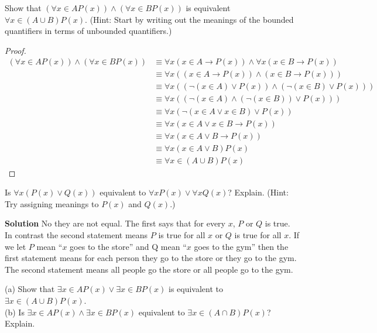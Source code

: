 \begin{tcolorbox}[title=Problem 8, breakable]
    Show that $(\forall{x} \in AP(x)) \wedge (\forall{x} \in B P(x))$ is equivalent 
    $\forall{x} \in (A \cup B)P(x)$. (Hint: Start by writing out the meanings of
    the bounded quantifiers in terms of unbounded quantifiers.)
\end{tcolorbox}

\begin{proof}
    \begin{align*}
        (\forall{x} \in AP(x)) \wedge (\forall{x} \in B P(x)) 
            &\equiv \forall{x}(x \in A \rightarrow P(x)) \wedge \forall{x}(x \in B \rightarrow P(x))  && \\
        &\equiv \forall{x}((x \in A \rightarrow P(x)) \wedge (x \in B \rightarrow P(x)))  && \\
        &\equiv \forall{x}((\neg(x \in A) \vee P(x)) \wedge (\neg(x \in B) \vee P(x)))  && \\
        &\equiv \forall{x}((\neg(x \in A) \wedge (\neg(x \in B)) \vee P(x)))  && \\
        &\equiv \forall{x}(\neg(x \in A \vee x \in B) \vee P(x))  && \\
        &\equiv \forall{x}(x \in A \vee x \in B \rightarrow P(x))  && \\
        &\equiv \forall{x}(x \in A \vee B \rightarrow P(x))  && \\
        &\equiv \forall{x}(x \in A \vee B)P(x)  && \\
        &\equiv \forall{x} \in (A \cup B)P(x)
    \end{align*}
\end{proof}

\begin{tcolorbox}[title=Problem 9, breakable]
    Is $\forall{x}(P(x) \vee Q(x))$ equivalent to $\forall{x}P(x) \vee \forall{x} Q(x)$? 
    Explain. (Hint: Try assigning meanings to $P(x)$ and $Q(x)$.)
\end{tcolorbox}

\textbf{Solution}
No they are not equal. The first says that for every $x$, $P$ or $Q$ is true. In contrast
the second statement means $P$ is true for all $x$ or $Q$ is true for all $x$. If we 
let $P$ mean ``$x$ goes to the store'' and Q mean ``$x$ goes to the gym'' then the first
statement means for each person they go to the store or they go to the gym. The second
statement means all people go the store or all people go to the gym.

\begin{tcolorbox}[title=Problem 10, breakable]
    (a) Show that $\exists{x} \in A P(x) \vee \exists{x} \in B P(x)$ is equivalent to 
    $\exists{x} \in (A \cup B) P(x)$. \\
    (b) Is $\exists{x} \in A P(x) \wedge \exists{x} \in B P(x)$ equivalent to 
    $\exists{x} \in (A \cap B) P(x)$? Explain.
\end{tcolorbox}

